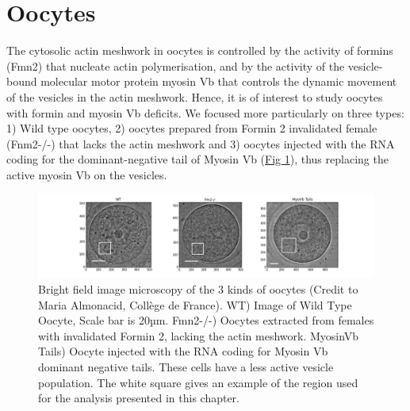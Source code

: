 \documentclass[A4paperpaper,11pt,english]{sphinxmanual}
\begin{document}
\section{Oocytes}
\label{parts/part5:oocytes}
The cytosolic actin meshwork in oocytes is controlled by the activity of formins (Fmn2) that
nucleate actin polymerisation, and by the activity of the vesicle-bound molecular motor protein myosin Vb that
controls the dynamic movement of the
vesicles in the actin meshwork. Hence, it is of interest to study oocytes with formin and myosin Vb deficits.
We focused more particularly on three types: 1) Wild type oocytes, 2) oocytes prepared from Formin 2 invalidated female
(Fnm2-/-) that lacks the
actin meshwork and 3) oocytes injected with the RNA coding for the dominant-negative tail of Myosin
Vb (\hyperref[parts/part5:fig3oo]{Fig  \ref*{parts/part5:fig3oo}}), thus replacing the active myosin Vb on the vesicles.
\begin{figure}[htbp]
\centering
\capstart

\includegraphics[width=1.000\linewidth]{3-oocytes.png}
\caption{Bright field image microscopy of the 3 kinds of oocytes (Credit to Maria
Almonacid, Collège de France). WT) Image of Wild Type Oocyte, Scale bar is
20µm. Fmn2-/-) Oocytes extracted from females with invalidated Formin 2,
lacking the actin meshwork. MyosinVb Tails) Oocyte injected
with the RNA coding for Myosin Vb dominant negative tails. These cells have a less active vesicle
population. The white square gives an example of the region used for the analysis presented in this chapter.}\label{parts/part5:fig3oo}\end{figure}
\end{document}
